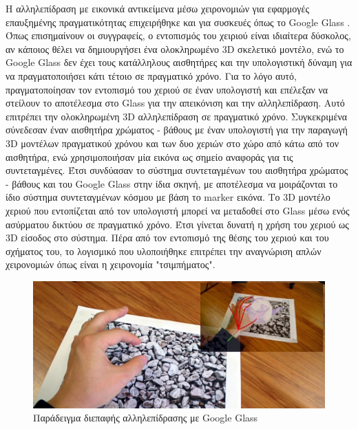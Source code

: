 Η αλληλεπίδραση με εικονικά αντικείμενα μέσω χειρονομιών για εφαρμογές επαυξημένης πραγματικότητας επιχειρήθηκε και για συσκευές όπως το Google Glass \cite{Bai2014} . Όπως επισημαίνουν οι συγγραφείς, ο εντοπισμός του χειριού είναι ιδιαίτερα δύσκολος, αν κάποιος θέλει να δημιουργήσει ένα ολοκληρωμένο 3D σκελετικό μοντέλο, ενώ το Google Glass δεν έχει τους κατάλληλους αισθητήρες και την υπολογιστική δύναμη για να πραγματοποιήσει κάτι τέτοιο σε πραγματικό χρόνο.
Για το λόγο αυτό, πραγματοποίησαν τον εντοπισμό του χεριού σε έναν υπολογιστή και επέλεξαν να στείλουν το αποτέλεσμα στο Glass για την απεικόνιση και την αλληλεπίδραση. Αυτό επιτρέπει την ολοκληρωμένη 3D αλληλεπίδραση σε πραγματικό χρόνο. Συγκεκριμένα σύνεδεσαν έναν αισθητήρα χρώματος - βάθους με έναν υπολογιστή για την παραγωγή 3D μοντέλων πραγματικού χρόνου και των δυο χεριών στο χώρο από κάτω από τον αισθητήρα, ενώ χρησιμοποιήσαν μία εικόνα ως σημείο αναφοράς για τις συντεταγμένες. Έτσι συνδύασαν το σύστημα συντεταγμένων του αισθητήρα χρώματος - βάθους και του Google Glass στην ίδια σκηνή, με αποτέλεσμα να μοιράζονται το ίδιο σύστημα συντεταγμένων κόσμου με βάση το marker εικόνα. Το 3D μοντέλο χεριού που εντοπίζεται από τον υπολογιστή μπορεί να μεταδοθεί στο Glass μέσω ενός ασύρματου δικτύου σε πραγματικό χρόνο. Έτσι γίνεται δυνατή η χρήση του χεριού ως 3D είσοδος στο σύστημα. Πέρα από τον εντοπισμό της θέσης του χεριού και του σχήματος του, το λογισμικό που υλοποιήθηκε επιτρέπει την αναγνώριση απλών χειρονομιών όπως είναι η χειρονομία "τσιμπήματος". 



\begin{figure}[H]
    \centering
    \includegraphics[scale=0.4, angle=0]{Files/Figures/GestureBannerFinal1.png}
    \caption[Παράδειγμα διεπαφής αλληλεπίδρασης με Google Glass]{Παράδειγμα διεπαφής αλληλεπίδρασης με Google Glass}
    \label{fig:glass}
\end{figure}




